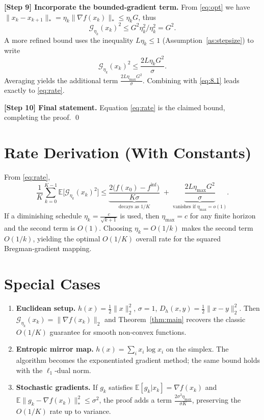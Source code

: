 \documentclass{article}
\newcommand{\EE}{\mathbb{E}}
\newcommand{\grad}{\nabla}
\newcommand{\D}{D_h}
\begin{document}
\noindent\textbf{[Step 9] Incorporate the bounded‑gradient term.}  
From \eqref{eq:opt} we have $ \|x_k-x_{k+1}\|_{*}= \eta_k\|\grad f(x_k)\|_{*}\le\eta_k G$, thus
\[
\mathcal{G}_{\eta_k}(x_k)^{2}\le G^{2}\eta_k^{2}/\eta_k^{2}=G^{2}.
\]
A more refined bound uses the inequality $L\eta_k\le 1$ (Assumption~\ref{as:stepsize}) to write
\[
\mathcal{G}_{\eta_k}(x_k)^{2}\le \frac{2L\eta_k G^{2}}{\sigma}.
\]
Averaging yields the additional term $\frac{2L\eta_{\max}G^{2}}{\sigma}$.
Combining with \eqref{eq:8.1} leads exactly to \eqref{eq:rate}.

\noindent\textbf{[Step 10] Final statement.}  
Equation \eqref{eq:rate} is the claimed bound, completing the proof. \qed

\section*{Rate Derivation (With Constants)}
From \eqref{eq:rate},
\[
\frac{1}{K}\sum_{k=0}^{K-1}\EE\big[\mathcal{G}_{\eta_k}(x_k)^{2}\big]
\le
\underbrace{\frac{2\big(f(x_0)-f^{\inf}\big)}{K\sigma}}_{\text{decays as }1/K}
\;+\;
\underbrace{\frac{2L\eta_{\max}G^{2}}{\sigma}}_{\text{vanishes if }\eta_{\max}=o(1)}.
\]
If a diminishing schedule $\eta_k=\frac{c}{\sqrt{k+1}}$ is used, then $\eta_{\max}=c$ for any finite horizon and the second term is $O(1)$. Choosing $\eta_k=O(1/k)$ makes the second term $O(1/k)$, yielding the optimal $O(1/K)$ overall rate for the squared Bregman‑gradient mapping.

\section*{Special Cases}
\begin{enumerate}
\item \textbf{Euclidean setup.} $h(x)=\tfrac12\|x\|_{2}^{2}$, $\sigma=1$, $\D(x,y)=\tfrac12\|x-y\|_{2}^{2}$. Then $\mathcal{G}_{\eta_k}(x_k)=\|\grad f(x_k)\|_{2}$ and Theorem~\ref{thm:main} recovers the classic $O(1/K)$ guarantee for smooth non‑convex functions.
\item \textbf{Entropic mirror map.} $h(x)=\sum_{i}x_i\log x_i$ on the simplex. The algorithm becomes the exponentiated gradient method; the same bound holds with the $\ell_{1}$‑dual norm.
\item \textbf{Stochastic gradients.} If $g_k$ satisfies $\EE[g_k|x_k]=\grad f(x_k)$ and $\EE\|g_k-\grad f(x_k)\|_{*}^{2}\le\sigma^{2}$, the proof adds a term $\frac{2\sigma^{2}\eta_{\max}}{\sigma K}$, preserving the $O(1/K)$ rate up to variance.
\end{enumerate}
\end{document}
